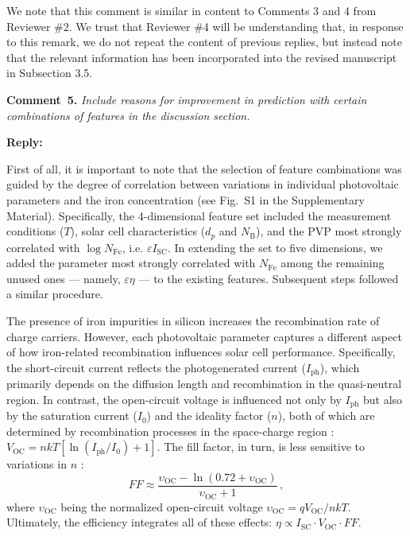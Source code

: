 \documentclass[a4paper,fleqn]{cas-sc}
\begin{document}
We note that this comment is similar in content to Comments 3 and 4 from Reviewer \#2.
We trust that Reviewer \#4 will be understanding that, in response to this remark, we do not repeat the content of previous replies,
but instead note that the relevant information has been incorporated into the revised manuscript in Subsection 3.5.



\vspace{1cm}
\noindent
\textcolor[rgb]{0.00,0.50,1.00}{\textbf{Comment~5.}}
\emph{Include reasons for improvement in prediction with certain combinations of features in the discussion section.}

\noindent
\textcolor[rgb]{0.51,0.00,0.00}{\textbf{Reply:}}

First of all, it is important to note that the selection of feature combinations was guided
by the degree of correlation between variations in individual photovoltaic parameters and the iron concentration (see Fig.~S1 in the Supplementary Material).
Specifically, the 4-dimensional feature set included the measurement conditions ($T$),
solar cell characteristics ($d_p$ and $N_\mathrm{B}$), and the PVP most strongly correlated with $\log N_\mathrm{Fe}$, i.e. $\varepsilon I_\mathrm{SC}$.
In extending the set to five dimensions, we added the parameter most strongly correlated with $N_\mathrm{Fe}$
among the remaining unused ones --- namely,  $\varepsilon \eta$  --- to the existing features.
Subsequent steps followed a similar procedure.

The presence of iron impurities in silicon increases the recombination rate of charge carriers.
However, each photovoltaic parameter captures a different aspect of how iron-related recombination influences solar cell performance.
Specifically, the short-circuit current reflects the photogenerated current ($I_\mathrm{ph}$),
which primarily depends on the diffusion length and recombination in the quasi-neutral region.
In contrast, the open-circuit voltage is influenced not only by $I_\mathrm{ph}$ but also by the saturation current ($I_0$)
and the ideality factor ($n$), both of which are determined by recombination processes in the space-charge region \cite{YangHandbookPVSi}:
$ V_\mathrm{OC} = nkT\left[ {\ln\left( {I_\mathrm{ph}/{I_0}} \right)+1} \right]$.
The fill factor, in turn, is less sensitive to variations in $n$ \cite{Green1982}:
\begin{equation}
\label{eqFF2}
    F\!F \approx \frac{\upsilon_\mathrm{OC}-\ln\left(0.72+\upsilon_\mathrm{OC}\right)}{\upsilon_\mathrm{OC}+1} \,,
\end{equation}
where
$\upsilon_\mathrm{OC}$ being the normalized open-circuit voltage
$\upsilon_\mathrm{OC}=qV_\mathrm{OC}/nkT$.
Ultimately, the efficiency integrates all of these effects: $\eta \propto I_\mathrm{SC}\cdot V_\mathrm{OC}\cdot F\!F$.
\end{document}
